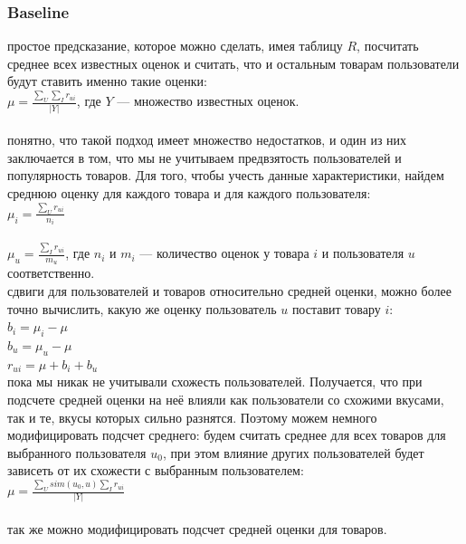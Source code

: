 \documentclass{article}
\newcommand\tab[1][1cm]{\hspace*{#1}}
\begin{document}
\subsubsection*{Baseline}
 простое предсказание, которое можно сделать, имея таблицу ﻿$R$﻿, посчитать среднее всех известных оценок и считать, что и остальным товарам пользователи будут ставить именно такие оценки:\\
$\mu=\frac{\sum_U{\sum_I{r_{ui}}}}{|Y|}$, где $Y$ — множество известных оценок.\\ 
\\
 понятно, что такой подход имеет множество недостатков, и один из них заключается в том, что мы не учитываем предвзятость пользователей и популярность товаров. Для того, чтобы учесть данные характеристики, найдем среднюю оценку для каждого товара и для каждого пользователя:\\
$\mu_i=\frac{\sum_U{r_{ui}}}{n_i}$\\
\vspace{1.5mm}\\
$\mu_u=\frac{\sum_I{r_{ui}}}{m_u}$, где ${n_i}$ и ${m_i}$ — количество оценок у товара $i$﻿ и пользователя ﻿$u$ соответственно.\\
 сдвиги для пользователей и товаров относительно средней оценки, можно более точно вычислить, какую же оценку пользователь ﻿$u$﻿ поставит товару $i$﻿﻿:\\
$b_i=\mu_i-\mu$\\
$b_u=\mu_u-\mu$\\
$r_{ui}=\mu+b_i+b_u$\\
 пока мы никак не учитывали схожесть пользователей. Получается, что при подсчете средней оценки на неё влияли как пользователи со схожими вкусами, так и те, вкусы которых сильно разнятся. Поэтому можем немного модифицировать подсчет среднего: будем считать среднее для всех товаров для выбранного пользователя ﻿$u_0$, при этом влияние других пользователей будет зависеть от их схожести с выбранным пользователем:\\
$\mu=\frac{\sum_U{sim(u_0,u)}\sum_I{r_{ui}}}{|Y|}$\\
\vspace{1.5mm}\\
 так же можно модифицировать подсчет средней оценки для товаров.
\end{document}
